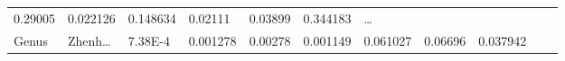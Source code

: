 \documentclass[
]{article}
\begin{document}
\begin{longtable}[]{@{}lllllllllll@{}}
\begin{minipage}[t]{0.09\columnwidth}
0.29005\strut
\end{minipage} & \begin{minipage}[t]{0.06\columnwidth}\raggedright
0.022126\strut
\end{minipage} & \begin{minipage}[t]{0.09\columnwidth}\raggedright
0.148634\strut
\end{minipage} & \begin{minipage}[t]{0.06\columnwidth}\raggedright
0.02111\strut
\end{minipage} & \begin{minipage}[t]{0.06\columnwidth}\raggedright
0.03899\strut
\end{minipage} & \begin{minipage}[t]{0.06\columnwidth}\raggedright
0.344183\strut
\end{minipage} & \begin{minipage}[t]{0.03\columnwidth}\raggedright
\ldots{}\strut
\end{minipage}\tabularnewline
\begin{minipage}[t]{0.06\columnwidth}\raggedright
Genus\strut
\end{minipage} & \begin{minipage}[t]{0.06\columnwidth}\raggedright
Zhenh\ldots{}\strut
\end{minipage} & \begin{minipage}[t]{0.09\columnwidth}\raggedright
7.38E-4\strut
\end{minipage} & \begin{minipage}[t]{0.06\columnwidth}\raggedright
0.001278\strut
\end{minipage} & \begin{minipage}[t]{0.09\columnwidth}\raggedright
0.00278\strut
\end{minipage} & \begin{minipage}[t]{0.06\columnwidth}\raggedright
0.001149\strut
\end{minipage} & \begin{minipage}[t]{0.09\columnwidth}\raggedright
0.061027\strut
\end{minipage} & \begin{minipage}[t]{0.06\columnwidth}\raggedright
0.06696\strut
\end{minipage} & \begin{minipage}[t]{0.06\columnwidth}\raggedright
0.037942\strut
\end{minipage} & \begin{minipage}[t]{0.06\columnwidth}\raggedright

\end{minipage}
\end{longtable}
\end{document}
